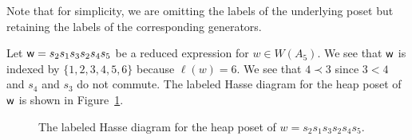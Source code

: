     Note that for simplicity, we are omitting the labels of the underlying poset but retaining the labels of the corresponding generators.

\begin{example}\label{ex:firstheap} Let $\mathsf{w} = s_2 s_1 s_3 s_2 s_4 s_5$ be a reduced expression for $w \in W(A_5)$.  We see that $\mathsf{w}$ is indexed by $\{1, 2, 3, 4, 5, 6\}$ because $\ell(w)=6$. We see that $4 \prec 3$ since $3 < 4$ and $s_4$ and $s_3$ do not commute.
    The labeled Hasse diagram for the heap poset of $\mathsf{w}$ is shown in Figure~\ref{fig:hasse}.
\begin{center} \begin{figure}[h!] \centering
{}
\caption{The labeled Hasse diagram for the heap poset of $w = s_2 s_1 s_3 s_2 s_4 s_5$.} \label{fig:hasse}
\end{figure} \end{center}
\end{example}

